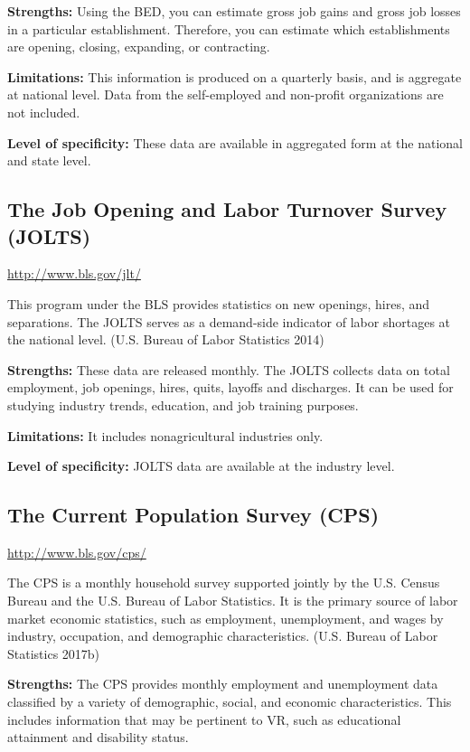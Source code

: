 \documentclass[]{book}
\theoremstyle{definition}
\theoremstyle{definition}
\theoremstyle{definition}
\theoremstyle{remark}
\begin{document}
\textbf{Strengths:} Using the BED, you can estimate gross job gains and
gross job losses in a particular establishment. Therefore, you can
estimate which establishments are opening, closing, expanding, or
contracting.

\textbf{Limitations:} This information is produced on a quarterly basis,
and is aggregate at national level. Data from the self-employed and
non-profit organizations are not included.

\textbf{Level of specificity:} These data are available in aggregated
form at the national and state level.

\subsection{The Job Opening and Labor Turnover Survey
(JOLTS)}\label{the-job-opening-and-labor-turnover-survey-jolts}

\url{http://www.bls.gov/jlt/}

This program under the BLS provides statistics on new openings, hires,
and separations. The JOLTS serves as a demand-side indicator of labor
shortages at the national level. (U.S. Bureau of Labor Statistics 2014)

\textbf{Strengths:} These data are released monthly. The JOLTS collects
data on total employment, job openings, hires, quits, layoffs and
discharges. It can be used for studying industry trends, education, and
job training purposes.

\textbf{Limitations:} It includes nonagricultural industries only.

\textbf{Level of specificity:} JOLTS data are available at the industry
level.

\subsection{The Current Population Survey
(CPS)}\label{the-current-population-survey-cps}

\url{http://www.bls.gov/cps/}

The CPS is a monthly household survey supported jointly by the U.S.
Census Bureau and the U.S. Bureau of Labor Statistics. It is the primary
source of labor market economic statistics, such as employment,
unemployment, and wages by industry, occupation, and demographic
characteristics. (U.S. Bureau of Labor Statistics 2017b)

\textbf{Strengths:} The CPS provides monthly employment and unemployment
data classified by a variety of demographic, social, and economic
characteristics. This includes information that may be pertinent to VR,
such as educational attainment and disability status.
\end{document}
